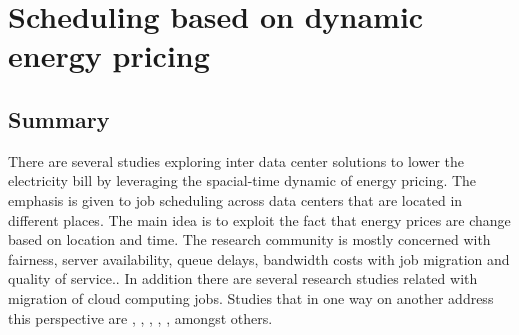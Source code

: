 \begin{comment}
\section{ARM architecture}
\subsection{Literature review}


\textbf{In \cite{ACAT13ARM}:}

- After 2015, processors have hit scaling limits. Two different paths started to be
taken on the processor industry:  development of multiprocessor architectures that
allow to run parallel tasks and the time clock frequency - which have been
increasing throughout the years - stabilized.

- Most High Physics Computing systems run in clusters of several cores.
Additional cores are parallelized and can run at the same time, which allows the
system to scale. However, also commodities such memory, I/O streams and energy
scale proportionally in such architectures.
 

\end{comment}

\section*{Scheduling based on dynamic energy pricing}



\subsection*{Summary}

There are several studies exploring inter data center solutions to lower
the electricity bill by leveraging the spacial-time dynamic of energy pricing. The 
emphasis is given to job scheduling across data centers that are located in 
different places. The main idea is to exploit the fact that energy prices 
are change based on location and time. The research community is mostly concerned 
with fairness, server availability, queue delays, bandwidth costs with job migration
and quality of service.. In addition there are several research studies related with 
migration of cloud computing jobs. Studies that in one way on another address this 
perspective are \cite{EFF_JOB_SCHEDULING}, \cite{MIGRATION_CLOUD}, 
\cite{MINIMIZING_DIST}, \cite{CUTTING_BILL}, \cite{SCHED_HETEROGE}, amongst others. 

